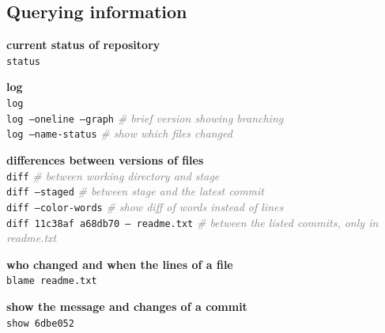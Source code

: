 \documentclass[landscape]{article}
\newcommand*{\prog}{\texttt}
\newcommand*{\proge}[1]{\textcolor{gray}{\textit{\# #1}}}
\begin{document}
\begin{multicols*}{3}
  \subsection{Querying information}

  \begin{myitemize}
    \item \textbf{current status of repository}\\
      \prog{status}
    \item \textbf{log}\\
      \prog{log}\\
      \prog{log --oneline --graph} \proge{brief version showing branching}\\
      \prog{log --name-status} \proge{show which files changed}
    \item \textbf{differences between versions of files}\\
      \prog{diff} \proge{between working directory and stage}\\
      \prog{diff --staged} \proge{between stage and the latest commit}\\
      \prog{diff --color-words} \proge{show diff of words instead of lines}\\
      \prog{diff 11c38af a68db70 -- readme.txt} \proge{between the listed commits, only in readme.txt}
    \item \textbf{who changed and when the lines of a file}\\
      \prog{blame readme.txt}
    \item \textbf{show the message and changes of a commit}\\
      \prog{show 6dbe052}
  \end{myitemize}


\end{multicols*}
\end{document}
